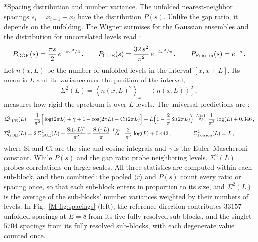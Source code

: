 \documentclass[aps,onecolumn,groupedaddress,nofootinbib,pra]{revtex4-2}
\makeatletter
\newcommand{\mainDocFilename}{chaotic-kummer-v1} %
\renewcommand\paragraph{\@startsection{paragraph}{4}{\parindent}{\z@}{-1em}{\normalfont\normalsize\bfseries}}
\newcommand{\rmean}{\langle r\rangle}
\makeatother
\begin{document}
\paragraph*{Spacing distribution and number variance.}
The unfolded nearest-neighbor spacings $s_i=x_{i+1}-x_i$ have the distribution $P(s)$. Unlike the gap ratio, it depends on the unfolding. The Wigner surmises for the Gaussian ensembles and the distribution for uncorrelated levels read \cite{Mehta2004}:
\begin{equation}
\label{eq:wigner}
P_{\rm GOE}(s)=\frac{\pi s}{2}\,e^{-\pi s^2/4}\,,\qquad
P_{\rm GUE}(s)=\frac{32\,s^2}{\pi^2}\,e^{-4s^2/\pi}\,,\qquad
P_{\rm Poisson}(s)=e^{-s}\,.
\end{equation}
Let $n(x,L)$ be the number of unfolded levels in the interval $[x,x+L]$. Its mean is $L$ and its variance over the position of the interval,
\begin{equation}
\label{eq:sigma2}
\Sigma^2(L)=\left\langle n(x,L)^2\right\rangle_x-\left\langle n(x,L)\right\rangle_x^2\,,
\end{equation}
measures how rigid the spectrum is over $L$ levels. The universal predictions are \cite{Mehta2004}:
\begin{equation}
\label{eq:sigma2goe}
\begin{aligned}
\Sigma^2_{\rm GUE}(L)&=\frac{1}{\pi^2}\Big[\log(2\pi L)+\gamma+1-\cos(2\pi L)-\mathrm{Ci}(2\pi L)\Big]
+L\Big(1-\frac{2}{\pi}\,\mathrm{Si}(2\pi L)\Big) \, \stackrel{L\gg 1}{\approx}\, \frac{1}{\pi^2} \,\log(L) + 0.346 \,,\\
\Sigma^2_{\rm GOE}(L)&=2\,\Sigma^2_{\rm GUE}(L)+\frac{\mathrm{Si}(\pi L)^2}{\pi^2}-\frac{\mathrm{Si}(\pi L)}{\pi}  \, \stackrel{L\gg 1}{\approx} \, \frac{2}{\pi^2}  \, \log(L) + 0.442
\,, \qquad\qquad
\Sigma^2_{\rm Poisson}(L) =L \,,
\end{aligned}
\end{equation}
where $\mathrm{Si}$ and $\mathrm{Ci}$ are the sine and cosine integrals and $\gamma$ is the Euler--Mascheroni constant. While $P(s)$ and the gap ratio probe neighboring levels, $\Sigma^2(L)$ probes correlations on larger scales. All three statistics are computed within each sub-block, and then combined: the pooled $\rmean$ and $P(s)$ count every ratio or spacing once, so that each sub-block enters in proportion to its size, and $\Sigma^2(L)$ is the average of the sub-blocks' number variances weighted by their numbers of levels. In Fig.~\ref{M-fig:spacings} (left), the reference direction contributes $33157$ unfolded spacings at $E=8$ from its five fully resolved sub-blocks, and the singlet $5704$ spacings from its fully resolved sub-blocks, with each degenerate value counted once.\\


\ifdefined\arXivversion\else\fi
\end{document}
